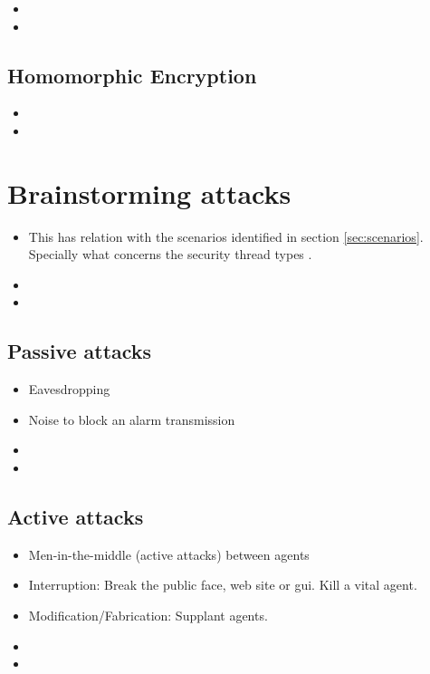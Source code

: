 \documentclass[10pt,a4paper,twoside]{llncs}
\begin{document}
\begin{itemize}
 \item 
 \item 
\end{itemize}

%
\subsection{Homomorphic Encryption \label{sec:Homorph}}
\begin{itemize}
 \item 
 \item 
\end{itemize}

%
\section{Brainstorming attacks \label{sec:attacks}}

\begin{itemize}
 \item This has relation with the scenarios identified in section \ref{sec:scenarios}. Specially what concerns the security thread types \cite{SecEngRossAnderson}.
 \item 
 \item
\end{itemize}

%
\subsection{Passive attacks \label{sec:passiveAttacks}}

\begin{itemize}
 \item Eavesdropping
 \item Noise to block an alarm transmission
 \item 
 \item 
\end{itemize}

%
\subsection{Active attacks \label{sec:activeAttacks}}

\begin{itemize}
 \item Men-in-the-middle (active attacks) between agents
 \item Interruption: Break the public face, web site or gui. Kill a vital agent.
 \item Modification/Fabrication: Supplant agents.
 \item 
 \item 
\end{itemize}
\end{document}
